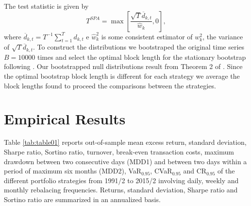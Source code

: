 \documentclass[a4paper,10pt]{article}
\begin{document}
  

\bigskip


\bigskip 

The test statistic is given by 
\[
T^{SPA}=\max \left[ \frac{\sqrt{T}\overline{d}%
	_{k,t}}{\widehat{w}_{k}},0\right] ,
\]%
where $\overline{d}_{k,t}=T^{-1}\sum_{t=1}^{T}d_{k,t}$ e $\widehat{w}%
_{k}^{2}$ is some consistent estimator of $w_{k}^{2}$, the variance of $%
\sqrt{T}\overline{d}_{k,t}$. To construct the distributions we bootstraped the original time
series $B=10000$ times and select the optimal block length for the
stationary bootstrap following \citet*{pw04}. Our bootstrapped null
distributions result from Theorem 2 of \citet*{pr94}. Since the optimal
bootstrap block length is different for each strategy we average the block
lengths found to proceed the comparisons between the strategies.

\vspace{0.3cm}

\section{Empirical Results}

Table \ref{tab:table01} reports out-of-sample mean
excess return, standard deviation, Sharpe ratio, Sortino ratio, turnover,
break-even transaction costs, maximum drawdown between two consecutive days
(MDD1) and between two days within a period of maximum six months (MDD2), VaR$_{0.95}$,
CVaR$_{0.95}$ and CR$_{0.95}$ of the different portfolio strategies from 1991/2 to 2015/2
involving daily, weekly and monthly rebalacing frequencies. Returns,
standard deviation, Sharpe ratio and Sortino ratio are summarized in an
annualized basis.
\end{document}
